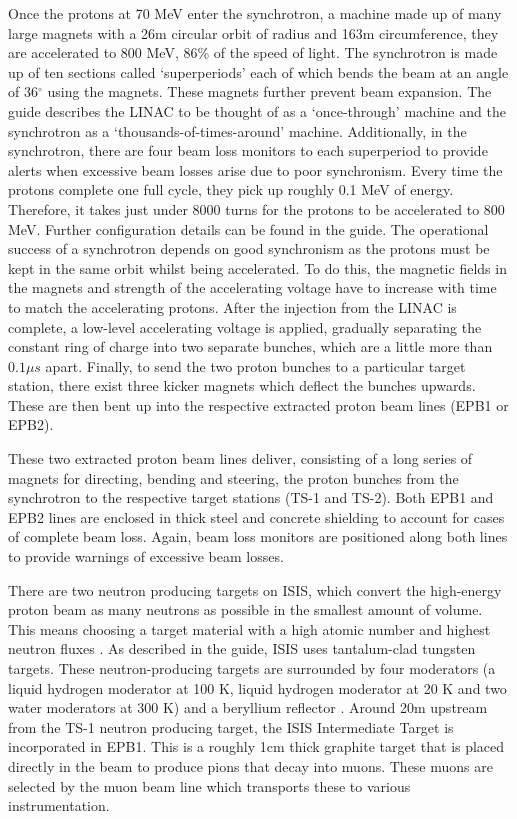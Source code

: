 \documentclass[10pt,oneside]{report}
\begin{document}
Once the protons at 70 MeV enter the synchrotron, a machine made up of many large magnets with a 26m circular orbit of radius and 163m circumference, they are accelerated to 800 MeV, 86\% of the speed of light. The synchrotron is made up of ten sections called `superperiods' each of which bends the beam at an angle of 36$^\circ$ using the magnets. These magnets further prevent beam expansion. The guide describes the LINAC to be thought of as a `once-through' machine and the synchrotron as a `thousands-of-times-around' machine. Additionally, in the synchrotron, there are four beam loss monitors to each superperiod to provide alerts when excessive beam losses arise due to poor synchronism. Every time the protons complete one full cycle, they pick up roughly 0.1 MeV of energy. Therefore, it takes just under 8000 turns for the protons to be accelerated to 800 MeV. Further configuration details can be found in the guide. The operational success of a synchrotron depends on good synchronism as the protons must be kept in the same orbit whilst being accelerated. To do this, the magnetic fields in the magnets and strength of the accelerating voltage have to increase with time to match the accelerating protons. After the injection from the LINAC is complete, a low-level accelerating voltage is applied, gradually separating the constant ring of charge into two separate bunches, which are a little more than $0.1\mu s$ apart. Finally, to send the two proton bunches to a particular target station, there exist three kicker magnets which deflect the bunches upwards. These are then bent up into the respective extracted proton beam lines (EPB1 or EPB2).

These two extracted proton beam lines deliver, consisting of a long series of magnets for directing, bending and steering, the proton bunches from the synchrotron to the respective target stations (TS-1 and TS-2). Both EPB1 and EPB2 lines are enclosed in thick steel and concrete shielding to account for cases of complete beam loss. Again, beam loss monitors are positioned along both lines to provide warnings of excessive beam losses. 

There are two neutron producing targets on ISIS, which convert the high-energy proton beam as many neutrons as possible in the smallest amount of volume. This means choosing a target material with a high atomic number and highest neutron fluxes \cite{stammler1983methods}. As described in the guide, ISIS uses tantalum-clad tungsten targets. These neutron-producing targets are surrounded by four moderators (a liquid hydrogen moderator at 100 K, liquid hydrogen moderator at 20 K and two water moderators at 300 K) and a beryllium reflector \cite{sharma2001nuclear}. Around 20m upstream from the TS-1 neutron producing target, the ISIS Intermediate Target is incorporated in EPB1. This is a roughly 1cm thick graphite target that is placed directly in the beam to produce pions that decay into muons. These muons are selected by the muon beam line which transports these to various instrumentation. \\ 
\end{document}

